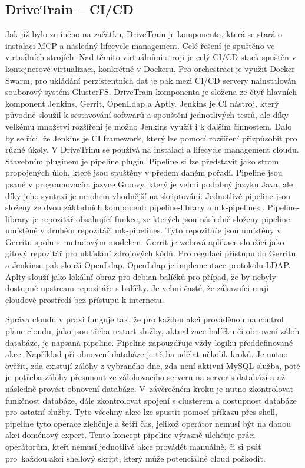 \subsection{DriveTrain – CI/CD}
Jak již bylo zmíněno na začátku, DriveTrain je komponenta, která se stará o instalaci MCP a následný lifecycle management. Celé řešení je spuštěno ve virtuálních strojích. Nad těmito virtuálními stroji je celý CI/CD stack spuštěn v kontejnerové virtualizaci, konkrétně v Dockeru. Pro orchestraci je využit Docker Swarm, pro ukládání perzistentních dat je pak mezi CI/CD servery nainstalován souborový systém GlusterFS. DriveTrain komponenta je složena ze čtyř hlavních komponent Jenkins, Gerrit, OpenLdap a Aptly. Jenkins je CI nástroj, který původně sloužil k sestavování softwarů a spouštění jednotlivých testů, ale díky velkému množství rozšíření je možno Jenkins využít i k dalším činnostem. Dalo by se říci, že Jenkins je CI framework, který lze pomocí rozšíření přizpůsobit pro různé úkoly. V DriveTrinu se používá na instalaci a lifecycle management cloudu. Stavebním pluginem je pipeline plugin. Pipeline si lze představit jako strom propojených úloh, které jsou spuštěny v předem daném pořadí. Pipeline jsou psané v programovacím jazyce Groovy, který je velmi podobný jazyku Java, ale díky jeho syntaxi je mnohem vhodnější na skriptování. Jednotlivé pipeline jsou složeny ze dvou základních komponent: pipeline-library \cite{github_pipelib} a mk-pipelines \cite{github_mkpipelines}. Pipeline-library je repozitář obsahující funkce, ze kterých jsou následně složeny pipeline umístěné v druhém repozitáři mk-pipelines. Tyto repozitáře jsou umístěny v Gerritu spolu s metadovým modelem. Gerrit je webová aplikace sloužící jako gitový repozitář pro ukládání zdrojových kódů. Pro regulaci přístupu do Gerritu a Jenkinse pak slouží OpenLdap. OpenLdap je implementace protokolu LDAP. Aplty slouží jako lokální obraz pro debian balíčků pro případ, že by nebyly dostupné upstream repozitáře s balíčky. Je velmi časté, že zákazníci mají cloudové prostředí bez přístupu k internetu.

Správa cloudu v praxi funguje tak, že pro každou akci prováděnou na control plane cloudu, jako jsou třeba restart služby, aktualizace balíčku či obnovení záloh databáze, je napsaná pipeline. Pipeline zapouzdřuje vždy logiku předdefinované akce. Například při obnovení databáze je třeba udělat několik kroků. Je nutno ověřit, zda existují zálohy z vybraného dne, zda není aktivní MySQL služba, poté je potřeba zálohy přesunout ze zálohovacího serveru na server s databází a až následně provést obnovení databáze. V závěrečném kroku je nutno zkontrolovat funkčnost databáze, dále zkontrolovat spojení s clusterem a dostupnost databáze pro ostatní služby. Tyto všechny akce lze spustit pomocí příkazu přes shell, pipeline tyto operace zlehčuje a šetří čas, jelikož operátor nemusí být na danou akci doménový expert. Tento koncept pipeline výrazně ulehčuje práci operátorům, kteří nemusí jednotlivé akce provádět manuálně, či si psát pro každou akci shellový skript, který může potenciálně cloud poškodit.


